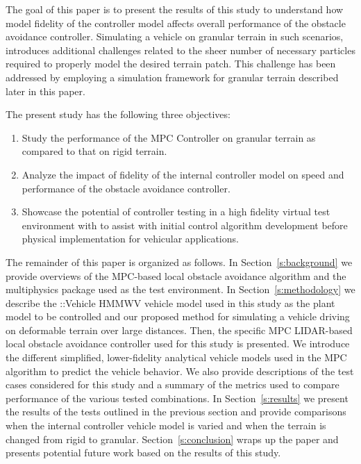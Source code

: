 \documentclass[12pt,twocolumn]{article}
\newcommand{\CHRONO}{{\sffamily{{Chrono}}}}
\newcommand{\ChronoVehicle}{{\sffamily{Chrono}}::Vehicle}
\begin{document}
The goal of this paper is to present the results of this study to understand how model fidelity of the controller model affects overall performance of the obstacle avoidance controller. Simulating a vehicle on granular terrain in such scenarios, introduces additional challenges related to the sheer number of necessary particles required to properly model the desired terrain patch. This challenge has been addressed by employing a simulation framework for granular terrain described later in this paper.

The present study has the following three objectives:
\begin{enumerate}
\item
Study the performance of the MPC Controller on granular terrain as compared to that on rigid terrain.
\item
Analyze the impact of fidelity of the internal controller model on speed and performance of the obstacle avoidance controller.
\item
Showcase the potential of controller testing in a high fidelity virtual test environment with {\CHRONO} to assist with initial control algorithm development before physical implementation for vehicular applications.
\end{enumerate}

The remainder of this paper is organized as follows.  In Section~\ref{s:background} we provide overviews of the MPC-based local obstacle avoidance algorithm and the {\CHRONO} multiphysics package used as the test environment. In Section~\ref{s:methodology} we describe the {\ChronoVehicle} HMMWV vehicle model used in this study as the plant model to be controlled and our proposed method for simulating a vehicle driving on deformable terrain over large distances. Then, the specific MPC LIDAR-based local obstacle avoidance controller used for this study is presented. We introduce the different simplified, lower-fidelity analytical vehicle models used in the MPC algorithm to predict the {\CHRONO} vehicle behavior. We also provide descriptions of the test cases considered for this study and a summary of the metrics used to compare performance of the various tested combinations. In Section~\ref{s:results} we present the results of the tests outlined in the previous section and provide comparisons when the internal controller vehicle model is varied and when the terrain is changed from rigid to granular. Section~\ref{s:conclusion} wraps up the paper and presents potential future work based on the results of this study.
\end{document}
